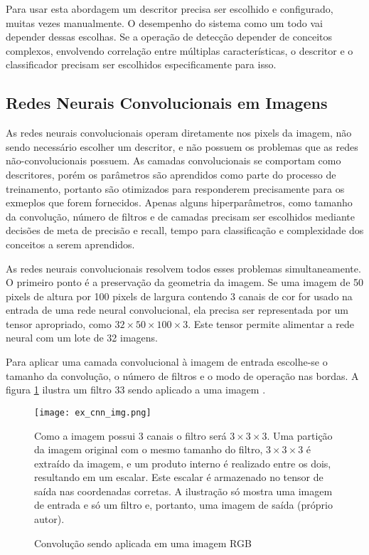 Para usar esta abordagem um descritor precisa ser escolhido e configurado,
muitas vezes manualmente. O desempenho do sistema como um todo vai depender
dessas escolhas. Se a operação de detecção depender de conceitos complexos,
envolvendo correlação entre múltiplas características, o descritor e o
classificador precisam ser escolhidos especificamente para isso.

\subsection{Redes Neurais Convolucionais em Imagens}
As redes neurais convolucionais operam diretamente nos pixels da imagem, não
sendo necessário escolher um descritor, e não possuem os problemas que as
redes não-convolucionais possuem. As camadas convolucionais se comportam como
descritores, porém os parâmetros são aprendidos como parte do processo de
treinamento, portanto são otimizados para responderem precisamente para os
exmeplos que forem fornecidos. Apenas alguns hiperparâmetros, como tamanho
da convolução, número de filtros e de camadas precisam ser escolhidos mediante
decisões de meta de precisão e recall, tempo para classificação e complexidade
dos conceitos a serem aprendidos.

As redes neurais convolucionais resolvem todos esses problemas simultaneamente.
O primeiro ponto é a preservação da geometria da imagem. Se uma imagem de 50
pixels de altura por 100 pixels de largura contendo 3 canais de cor for usado na
entrada de uma rede neural convolucional, ela precisa ser representada por um
tensor apropriado, como $32 \times 50 \times 100 \times 3$. Este tensor
permite alimentar a rede neural com um lote de 32 imagens.

Para aplicar uma camada convolucional à imagem de entrada escolhe-se o tamanho
da convolução, o número de filtros e o modo de operação nas bordas. A figura
\ref{fig:ex_cnn_img} ilustra um filtro 33 sendo aplicado a uma imagem
.

\begin{figure}[!htb]
	\centering
	\texttt{[image: ex\_cnn\_img.png]}
	\caption{Convolução sendo aplicada em uma imagem RGB}
	\label{fig:ex_cnn_img}
	Como a imagem possui 3 canais o filtro será $3 \times 3 \times 3$.
	Uma partição da imagem original com o mesmo tamanho do filtro,
	$3 \times 3 \times 3$ é extraído da imagem, e um
	produto interno é realizado entre os dois, resultando em um escalar. Este
	escalar é armazenado no tensor de saída nas coordenadas corretas. A
	ilustração só mostra uma imagem de entrada e só um filtro e, portanto, uma
	imagem de saída (próprio autor).
\end{figure}

